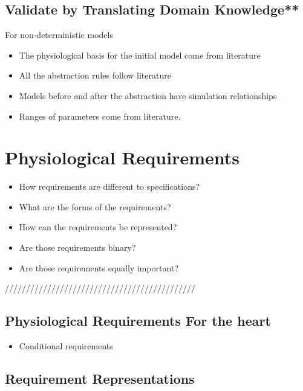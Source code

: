 \documentclass[openany]{now} %
\begin{document}
\section{Validate by Translating Domain Knowledge**}
For non-deterministic models
\begin{itemize}
	\item The physiological basis for the initial model come from literature
    \item All the abstraction rules follow literature
    \item Models before and after the abstraction have simulation relationships
    \item Ranges of parameters come from literature.
\end{itemize}

 
\chapter{Physiological Requirements}
\begin{itemize}
	\item How requirements are different to specifications?
    \item What are the forms of the requirements?
    \item How can the requirements be represented?
    \item Are those requirements binary?
    \item Are those requirements equally important?
\end{itemize}
/////////////////////////////////////////////

\section{Physiological Requirements For the heart}
\begin{itemize}
	\item Conditional requirements
\end{itemize}

\section{Requirement Representations}
\end{document}
